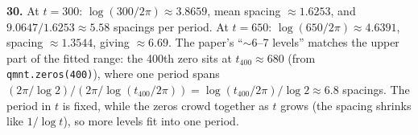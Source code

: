 \textbf{30.} At $t=300$: $\log(300/2\pi)\approx3.8659$, mean spacing $\approx1.6253$, and $9.0647/1.6253\approx5.58$ spacings per period. At $t=650$: $\log(650/2\pi)\approx4.6391$, spacing $\approx1.3544$, giving $\approx6.69$. The paper's ``$\sim$6--7 levels'' matches the upper part of the fitted range: the 400th zero sits at $t_{400}\approx680$ (from \texttt{qmnt.zeros(400)}), where one period spans $(2\pi/\log2)/(2\pi/\log(t_{400}/2\pi))=\log(t_{400}/2\pi)/\log2\approx6.8$ spacings. The period in $t$ is fixed, while the zeros crowd together as $t$ grows (the spacing shrinks like $1/\log t$), so more levels fit into one period.




